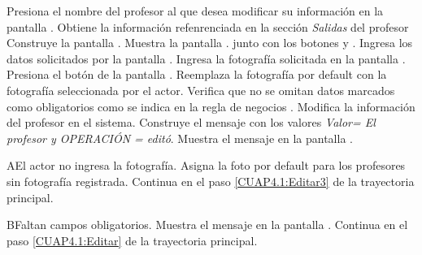 	\begin{UCtrayectoria}
		\UCpaso[\UCactor] Presiona el nombre del profesor al que desea modificar su información en la pantalla .
		\UCpaso[\UCsist] Obtiene la información refenrenciada en la sección \textit{Salidas} del profesor
		\UCpaso[\UCsist] Construye la pantalla .
		\UCpaso[\UCsist] Muestra la pantalla . junto con los botones  y . 
		\UCpaso[\UCactor] Ingresa los datos solicitados por la pantalla .\label{CUAP4.1:Editar} 
		\UCpaso[\UCactor] Ingresa la fotografía solicitada en la pantalla .
		\UCpaso Presiona el botón  de la pantalla .\label{CUAP4.1:Editar3} 
		\UCpaso[\UCsist] Reemplaza la fotografía por default con la fotografía seleccionada por el actor.
		\UCpaso[\UCsist] Verifica que no se omitan datos marcados como obligatorios como se indica en la regla de negocios . 
		\UCpaso[\UCsist] Modifica la información del profesor en el sistema. \label{CUAP4.1:Editar2}
		\UCpaso[\UCsist] Construye el mensaje  con los valores \textit{Valor= El profesor y OPERACIÓN = editó}.
		\UCpaso[\UCsist] Muestra el mensaje   en la pantalla .
		
				
%		
		
	\end{UCtrayectoria}
	
		\begin{UCtrayectoriaA}{A}{El actor no ingresa la fotografía.}
		\UCpaso[\UCsist] Asigna la foto por default para los profesores sin fotografía registrada.
		\UCpaso[] Continua en el paso \ref{CUAP4.1:Editar3} de la trayectoria principal.
	\end{UCtrayectoriaA}
	
	\begin{UCtrayectoriaA}{B}{Faltan campos obligatorios.}
		\UCpaso[\UCsist] Muestra el mensaje  en la pantalla  .
		\UCpaso[] Continua en el paso \ref{CUAP4.1:Editar} de la trayectoria principal.
	\end{UCtrayectoriaA}
	
